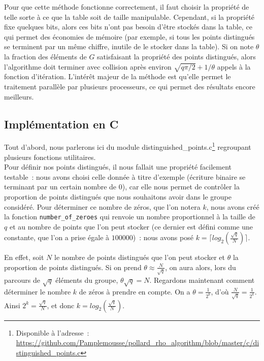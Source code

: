       Pour que cette méthode fonctionne correctement, il faut choisir la propriété de telle sorte à ce que la table soit de taille manipulable. Cependant, si la propriété fixe quelques bits, alors ces bits n'ont pas besoin d'être stockés dans la table, ce qui permet des économies de mémoire (par exemple, si tous les points distingués se terminent par un même chiffre, inutile de le stocker dans la table). Si on note $\theta$ la fraction des éléments de $G$ satisfaisant la propriété des points distingués, alors l'algorithme doit terminer avec collision après environ $\sqrt{q\pi/2} + 1/\theta$ appels à la fonction d'itération. L'intérêt majeur de la méthode est qu'elle permet le traitement parallèle par plusieurs processeurs, ce qui permet des résultats encore meilleurs.

      \subsection{Implémentation en C}
      Tout d'abord, nous parlerons ici du module distinguished\_points.c\footnote{Disponible à l'adresse~: \url{https://github.com/Pamplemousse/pollard_rho_algorithm/blob/master/c/distinguished_points.c}} regroupant plusieurs fonctions utilitaires.\\

      Pour définir nos points distingués, il nous fallait une propriété facilement testable~: nous avons choisi celle donnée à titre d'exemple (écriture binaire se terminant par un certain nombre de $0$), car elle nous permet de contrôler la proportion de points distingués que nous souhaitons avoir dans le groupe considéré.
      Pour déterminer ce nombre de zéros, que l'on notera $k$, nous avons créé la fonction \lstinline{number_of_zeroes} qui renvoie un nombre proportionnel à la taille de $q$ et au nombre de points que l'on peut stocker (ce dernier est défini comme une constante, que l'on a prise égale à $100000$)~: nous avons posé $k = \lceil log_2(\frac{\sqrt{q}}{N}) \rceil $.

      En effet, soit $N$ le nombre de points distingués que l'on peut stocker et $\theta$ la proportion de points distingués. Si on prend $\theta \approx \frac{N}{\sqrt{q}}$, on aura alors, lors du parcours de $\sqrt{q}$ éléments du groupe, $\theta \sqrt{q} = N$.
      Regardons maintenant comment déterminer le nombre $k$ de zéros à prendre en compte.
      On a $\theta = \frac{1}{2^k}$, d'où $\frac{N}{\sqrt{q}} = \frac{1}{2^k}$. Ainsi $2^k = \frac{\sqrt{q}}{N}$, et donc $k = log_2(\frac{\sqrt{q}}{N})$.\\

